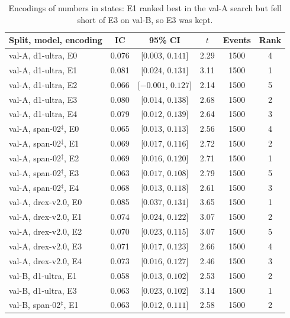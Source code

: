 \begin{table}[htbp]
\centering
\small
\begin{threeparttable}
\caption{Encodings of numbers in states: E1 ranked best in the val-A search but fell short of E3 on val-B, so E3 was kept.}\label{tab:a-encoding}
\begin{tabular}{@{}lS[table-format=1.3]cS[table-format=1.2]S[table-format=4.0]S[table-format=1.0]@{}}
\toprule
Split, model, encoding & {IC} & 95\% CI & {$t$} & {Events} & {Rank} \\
\midrule
val-A, d1-ultra, E0 & 0.076 & [$0.003$, $0.141$] & 2.29 & 1500 & 4 \\
val-A, d1-ultra, E1 & 0.081 & [$0.024$, $0.131$] & 3.11 & 1500 & 1 \\
val-A, d1-ultra, E2 & 0.066 & [$-0.001$, $0.127$] & 2.14 & 1500 & 5 \\
val-A, d1-ultra, E3 & 0.080 & [$0.014$, $0.138$] & 2.68 & 1500 & 2 \\
val-A, d1-ultra, E4 & 0.079 & [$0.012$, $0.139$] & 2.64 & 1500 & 3 \\
val-A, span-02$^{\ddagger}$, E0 & 0.065 & [$0.013$, $0.113$] & 2.56 & 1500 & 4 \\
val-A, span-02$^{\ddagger}$, E1 & 0.069 & [$0.017$, $0.116$] & 2.72 & 1500 & 2 \\
val-A, span-02$^{\ddagger}$, E2 & 0.069 & [$0.016$, $0.120$] & 2.71 & 1500 & 1 \\
val-A, span-02$^{\ddagger}$, E3 & 0.063 & [$0.017$, $0.108$] & 2.79 & 1500 & 5 \\
val-A, span-02$^{\ddagger}$, E4 & 0.068 & [$0.013$, $0.118$] & 2.61 & 1500 & 3 \\
val-A, drex-v2.0, E0 & 0.085 & [$0.037$, $0.131$] & 3.65 & 1500 & 1 \\
val-A, drex-v2.0, E1 & 0.074 & [$0.024$, $0.122$] & 3.07 & 1500 & 2 \\
val-A, drex-v2.0, E2 & 0.070 & [$0.023$, $0.115$] & 3.07 & 1500 & 5 \\
val-A, drex-v2.0, E3 & 0.071 & [$0.017$, $0.123$] & 2.66 & 1500 & 4 \\
val-A, drex-v2.0, E4 & 0.073 & [$0.016$, $0.127$] & 2.46 & 1500 & 3 \\
val-B, d1-ultra, E1 & 0.058 & [$0.013$, $0.102$] & 2.53 & 1500 & 2 \\
val-B, d1-ultra, E3 & 0.063 & [$0.023$, $0.102$] & 3.14 & 1500 & 1 \\
val-B, span-02$^{\ddagger}$, E1 & 0.063 & [$0.012$, $0.111$] & 2.58 & 1500 & 2 \\

\end{tabular}
\end{threeparttable}
\end{table}
